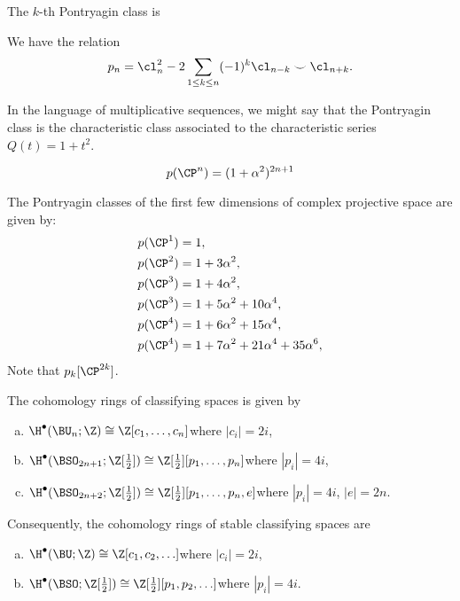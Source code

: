 \begin{definition}
	The $k$-th Pontryagin class is
\end{definition}

\begin{proposition}
	We have the relation
	\[
		p_n =\cl_n^2 - 2\sum_{1\leq k\leq n}(-1)^k\cl_{n-k}\smile \cl_{n+k}.
	\]
\end{proposition}

In the language of multiplicative sequences, we might say that the Pontryagin class is the characteristic class associated to the characteristic series $Q(t)=1+t^2$.

\begin{proposition}\label{prop:pontryagin-class-complex-projective-space}
	\[
		p(\CP^n) = (1+\alpha^2)^{2n+1}
	\]
\end{proposition}

\begin{example}
	The Pontryagin classes of the first few dimensions of complex projective space are given by:
	\[
		\begin{aligned}
			p(\CP^1) & = 1,                                    \\
			p(\CP^2) & = 1+3\alpha^2,                          \\
			p(\CP^3) & = 1+4\alpha^2,                          \\
			p(\CP^3) & = 1+5\alpha^2 + 10\alpha^4,             \\
			p(\CP^4) & = 1+6\alpha^2 + 15\alpha^4,             \\
			p(\CP^4) & = 1+7\alpha^2 + 21\alpha^4+ 35\alpha^6, \\
		\end{aligned}
	\]
	Note that $p_k[\CP^{2k}]$.
\end{example}

\begin{theorem}\label{thm:cohomology-o}
	The cohomology rings of classifying spaces is given by
	\begin{enumerate}[(a)]
		\item $\H^\bullet(\BU_n;\Z)\cong \Z[c_1,\ldots, c_n]$\hfill where $|c_i|=2i$,
		\item $\H^\bullet(\BSO_{2n+1};\Z[\frac12])\cong \Z[\frac12][p_1,\ldots, p_n]$\hfill where $|p_i|=4i$,
		\item $\H^\bullet(\BSO_{2n+2};\Z[\frac12])\cong \Z[\frac12][p_1,\ldots, p_n, e]$\hfill where $|p_i|=4i$, $|e|=2n$.
	\end{enumerate}
	Consequently, the cohomology rings of stable classifying spaces are 
	\begin{enumerate}[(a)]
		\item $\H^\bullet(\BU;\Z)\cong \Z[c_1,c_2,\ldots]$\hfill where $|c_i|=2i$,
		\item $\H^\bullet(\BSO;\Z[\frac12])\cong \Z[\frac12][p_1,p_2,\ldots]$\hfill where $|p_i|=4i$.
	\end{enumerate}
\end{theorem}

